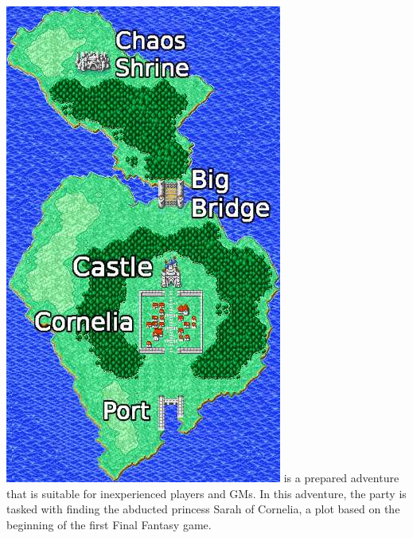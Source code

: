 %
\\\\
%
\includegraphics[width=\columnwidth]{./art/chaosincornelia/map.jpg} \ofpar
%
 is a prepared adventure that is suitable for inexperienced players and GMs.
In this adventure, the party is tasked with finding the abducted princess Sarah of Cornelia, a plot based on the beginning of the first Final Fantasy game.
